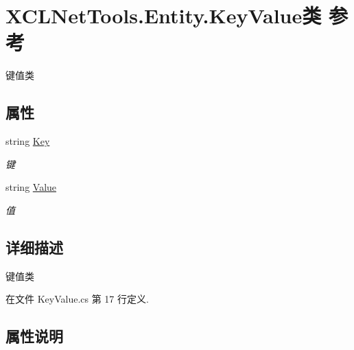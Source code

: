 \hypertarget{class_x_c_l_net_tools_1_1_entity_1_1_key_value}{}\section{X\+C\+L\+Net\+Tools.\+Entity.\+Key\+Value类 参考}
\label{class_x_c_l_net_tools_1_1_entity_1_1_key_value}


键值类  


\subsection*{属性}
\begin{DoxyCompactItemize}
\item 
string \hyperlink{class_x_c_l_net_tools_1_1_entity_1_1_key_value_a33e2f7bfdcc6a1dce560304a4450cf08}{Key}
\begin{DoxyCompactList}\small\item\em 键 \end{DoxyCompactList}\item 
string \hyperlink{class_x_c_l_net_tools_1_1_entity_1_1_key_value_a9ec3c76143930f64c1e0de2074514bae}{Value}
\begin{DoxyCompactList}\small\item\em 值 \end{DoxyCompactList}\end{DoxyCompactItemize}


\subsection{详细描述}
键值类 



在文件 Key\+Value.\+cs 第 17 行定义.



\subsection{属性说明}
\mbox{\label{class_x_c_l_net_tools_1_1_entity_1_1_key_value_a33e2f7bfdcc6a1dce560304a4450cf08}} 

